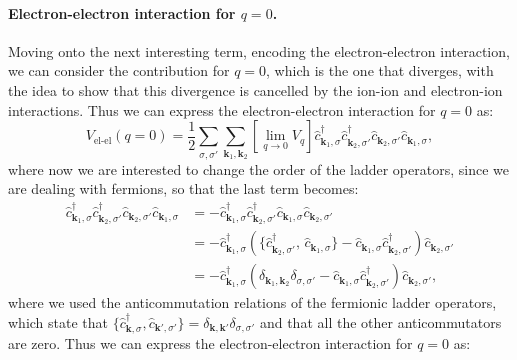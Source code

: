 \paragraph{Electron-electron interaction for \(q=0\).}
Moving onto the next interesting term, encoding the electron-electron interaction, we can consider the contribution for \(q=0\), which is the one that diverges, with the idea to show that this divergence is cancelled by the ion-ion and electron-ion interactions. Thus we can express the electron-electron interaction for \(q=0\) as:
\[
    V_{\text{el-el}} (q=0) = \frac{1}{2} \sum_{\sigma, \sigma'} \sum_{\mathbf{k}_1, \mathbf{k}_2} \left[ \lim_{q \to 0} V_q \right] \hat{c}_{\mathbf{k}_1, \sigma}^\dagger \hat{c}_{\mathbf{k}_2, \sigma'}^\dagger \hat{c}_{\mathbf{k}_2, \sigma'} \hat{c}_{\mathbf{k}_1, \sigma},
\]
where now we are interested to change the order of the ladder operators, since we are dealing with fermions, so that the last term becomes:
\[
    \begin{aligned}
        \hat{c}_{\mathbf{k}_1, \sigma}^\dagger \hat{c}_{\mathbf{k}_2, \sigma'}^\dagger \hat{c}_{\mathbf{k}_2, \sigma'} \hat{c}_{\mathbf{k}_1, \sigma} & = -\hat{c}_{\mathbf{k}_1, \sigma}^\dagger \hat{c}_{\mathbf{k}_2, \sigma'}^\dagger \hat{c}_{\mathbf{k}_1, \sigma} \hat{c}_{\mathbf{k}_2, \sigma'}                                                                                                  \\
                                                                                                                                                      & = -\hat{c}_{\mathbf{k}_1, \sigma}^\dagger \left( \{ \hat{c}_{\mathbf{k}_2, \sigma'}^\dagger,\, \hat{c}_{\mathbf{k}_1, \sigma} \} - \hat{c}_{\mathbf{k}_1, \sigma} \hat{c}_{\mathbf{k}_2, \sigma'}^\dagger \right) \hat{c}_{\mathbf{k}_2, \sigma'} \\
                                                                                                                                                      & = -\hat{c}_{\mathbf{k}_1, \sigma}^\dagger \left( \delta_{\mathbf{k}_1, \mathbf{k}_2} \delta_{\sigma, \sigma'} - \hat{c}_{\mathbf{k}_1, \sigma} \hat{c}_{\mathbf{k}_2, \sigma'}^\dagger \right) \hat{c}_{\mathbf{k}_2, \sigma'},
    \end{aligned}
\]
where we used the anticommutation relations of the fermionic ladder operators, which state that \(\{ \hat{c}_{\mathbf{k}, \sigma}^\dagger, \hat{c}_{\mathbf{k}', \sigma'} \} = \delta_{\mathbf{k}, \mathbf{k}'} \delta_{\sigma, \sigma'}\) and that all the other anticommutators are zero. Thus we can express the electron-electron interaction for \(q=0\) as:
